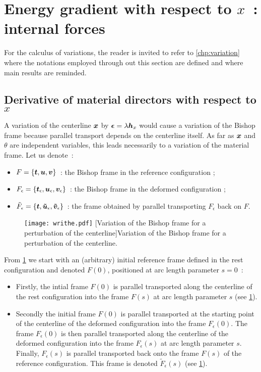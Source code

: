 \section{Energy gradient with respect to $x$~: internal forces}\label{eq:dE_dx}

For the calculus of variations, the reader is invited to refer to \cref{chp:variation} where the notations employed through out this section are defined and where main results are reminded. 

\subsection{Derivative of material directors with respect to $x$}
A variation of the centerline $\boldsymbol{x}$ by $\boldsymbol{\epsilon} = \lambda \boldsymbol{h}_x$ would cause a variation of the Bishop frame because parallel transport depends on the centerline itself. As far as $\boldsymbol{x}$ and $\theta$ are independent variables, this leads necessarily to a variation of the material frame. Let us denote~:
\begin{itemize}
\item
$F = \{\boldsymbol{t}, \boldsymbol{u},\boldsymbol{v}\}$~: the Bishop frame in the reference configuration ;
\item
 $F_\epsilon = \{\boldsymbol{t}_\epsilon, \boldsymbol{u}_\epsilon,\boldsymbol{v}_\epsilon\}$~: the Bishop frame in the deformed configuration ;
 \item
$\tilde{F}_\epsilon = \{\boldsymbol{t}, \boldsymbol{\tilde{u}}_\epsilon,\boldsymbol{\tilde{v}}_\epsilon\}$~: the frame obtained by parallel transporting $F_\epsilon$ back on $F$.
\end{itemize}
\begin{figure}[p]
\begin{fullpage}
\centering
\texttt{[image: writhe.pdf]}
[Variation of the Bishop frame for a perturbation of the centerline]{Variation of the Bishop frame for a perturbation of the centerline.}
\label{fig:varbishop}
\end{fullpage}
\end{figure}
From \cref{fig:varbishop} we start with an (arbitrary) initial reference frame defined in the rest configuration and denoted $F(0)$, positioned at arc length parameter $s=0$~:
\begin{itemize}
\item 
Firstly, the intial frame $F(0)$ is parallel transported along the centerline of the rest configuration into the frame $F(s)$ at arc length parameter $s$ (see \cref{fig:varbishop}).
\item
Secondly the initial frame $F(0)$ is parallel transported at the starting point of the centerline of the deformed configuration into the frame $F_{\epsilon}(0)$. The frame $F_{\epsilon}(0)$ is then parallel transported along the centerline of the deformed configuration into the frame $F_{\epsilon}(s)$ at arc length parameter $s$. Finally, $F_{\epsilon}(s)$ is parallel transported back onto the frame $F(s)$ of the reference configuration. This frame is denoted $\tilde{F}_\epsilon(s)$ (see \cref{fig:varbishop}).
\end{itemize}
